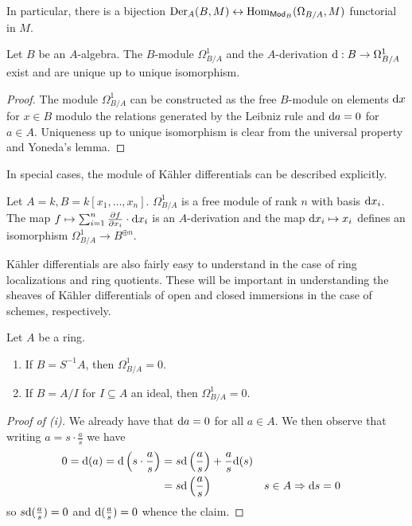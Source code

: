 In particular, there is a bijection $\mathrm{Der}_{A}(B,M)\leftrightarrow\mathrm{Hom}_{\mathsf{Mod}_{B}}(\Omega_{B/A},M)$ functorial in $M$. 
\begin{proposition}\label{prop: uniqueness of differentials}
    Let $B$ be an $A$-algebra. The $B$-module $\Omega^{1}_{B/A}$ and the $A$-derivation $\mathrm{d}:B\to\Omega^{1}_{B/A}$ exist and are unique up to unique isomorphism. 
\end{proposition}
\begin{proof}
    The module $\Omega^{1}_{B/A}$ can be constructed as the free $B$-module on elements $\mathrm{d} x$ for $x\in B$ modulo the relations generated by the Leibniz rule and $\mathrm{d} a=0$ for $a\in A$. Uniqueness up to unique isomorphism is clear from the universal property and Yoneda's lemma. 
\end{proof}
In special cases, the module of K\"{a}hler differentials can be described explicitly. 
\begin{example}\label{ex: differentials of affine space}
    Let $A=k,B=k[x_{1},\dots,x_{n}]$. $\Omega_{B/A}^{1}$ is a free module of rank $n$ with basis $\mathrm{d} x_{i}$. The map $f\mapsto\sum_{i=1}^{n}\frac{\partial f}{\partial x_{i}}\cdot \mathrm{d} x_{i}$ is an $A$-derivation and the map $\mathrm{d} x_{i}\mapsto x_{i}$ defines an isomorphism $\Omega_{B/A}^{1}\to B^{\oplus n}$. 
\end{example}
K\"{a}hler differentials are also fairly easy to understand in the case of ring localizations and ring quotients. These will be important in understanding the sheaves of K\"{a}hler differentials of open and closed immersions in the case of schemes, respectively. 
\begin{proposition}\label{prop: differentials of open and closed immersions}
    Let $A$ be a ring. 
    \begin{enumerate}[label=(\roman*)]
        \item If $B=S^{-1}A$, then $\Omega^{1}_{B/A}=0$. 
        \item If $B=A/I$ for $I\subseteq A$ an ideal, then $\Omega^{1}_{B/A}=0$. 
    \end{enumerate}
\end{proposition}
\begin{proof}[Proof of (i)]
    We already have that $\mathrm{d} a=0$ for all $a\in A$. We then observe that writing $a=s\cdot\frac{a}{s}$ we have 
    \begin{align*}
        0=\mathrm{d}(a)=\mathrm{d}\left(s\cdot\frac{a}{s}\right) &= s\mathrm{d}\left(\frac{a}{s}\right)+\frac{a}{s}\mathrm{d}(s) \\
        &= s\mathrm{d}\left(\frac{a}{s}\right) && s\in A\Rightarrow \mathrm{d} s=0 
    \end{align*}
    so $s\mathrm{d}(\frac{a}{s})=0$ and $\mathrm{d}(\frac{a}{s})=0$ whence the claim. 
\end{proof}
